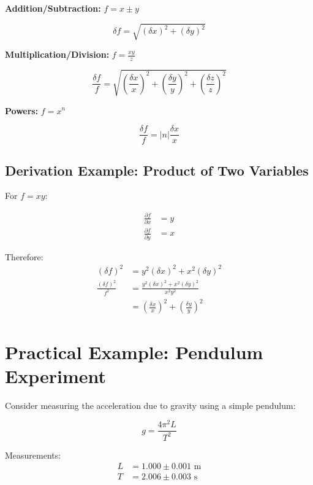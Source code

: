 \documentclass[twoside]{book}
\begin{document}
\textbf{Addition/Subtraction:} $f = x \pm y$

\begin{equation*}
\delta f = \sqrt{(\delta x)^2 + (\delta y)^2}
\end{equation*}

\textbf{Multiplication/Division:} $f = \frac{xy}{z}$

\begin{equation*}
\frac{\delta f}{f} = \sqrt{\left(\frac{\delta x}{x}\right)^2 + \left(\frac{\delta y}{y}\right)^2 + \left(\frac{\delta z}{z}\right)^2}
\end{equation*}

\textbf{Powers:} $f = x^n$

\begin{equation*}
\frac{\delta f}{f} = |n|\frac{\delta x}{x}
\end{equation*}

\subsection{Derivation Example: Product of Two Variables}

For $f = xy$:

\begin{align*}
\frac{\partial f}{\partial x} &= y \\
\frac{\partial f}{\partial y} &= x
\end{align*}

Therefore:
\begin{align*}
(\delta f)^2 &= y^2(\delta x)^2 + x^2(\delta y)^2 \\
\frac{(\delta f)^2}{f^2} &= \frac{y^2(\delta x)^2 + x^2(\delta y)^2}{x^2y^2} \\
&= \left(\frac{\delta x}{x}\right)^2 + \left(\frac{\delta y}{y}\right)^2
\end{align*}

\section{Practical Example: Pendulum Experiment}

Consider measuring the acceleration due to gravity using a simple pendulum:

\begin{equation*}
g = \frac{4\pi^2 L}{T^2}
\end{equation*}

Measurements:
\begin{align*}
L &= 1.000 \pm 0.001 \text{ m} \\
T &= 2.006 \pm 0.003 \text{ s}
\end{align*}
\end{document}

